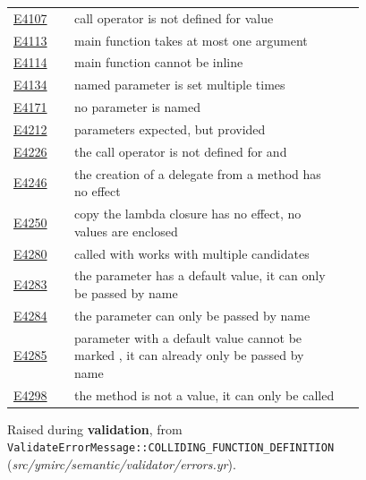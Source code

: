 \begin{longtable}{@{}l p{0.78\linewidth} r@{}}
\hyperref[sec:codes:e4107]{E4107} & call operator is not defined for value \errhole{} & \pageref{sec:codes:e4107}\\
\hyperref[sec:codes:e4113]{E4113} & main function takes at most one argument & \pageref{sec:codes:e4113}\\
\hyperref[sec:codes:e4114]{E4114} & main function cannot be inline & \pageref{sec:codes:e4114}\\
\hyperref[sec:codes:e4134]{E4134} & named parameter \errhole{} is set multiple times & \pageref{sec:codes:e4134}\\
\hyperref[sec:codes:e4171]{E4171} & no parameter is named \errhole{} & \pageref{sec:codes:e4171}\\
\hyperref[sec:codes:e4212]{E4212} & \errhole{} parameters \errhole{} expected, but \errhole{} \errhole{} provided & \pageref{sec:codes:e4212}\\
\hyperref[sec:codes:e4226]{E4226} & the call operator is not defined for \errhole{} and \errhole{} & \pageref{sec:codes:e4226}\\
\hyperref[sec:codes:e4246]{E4246} & the creation of a delegate from a method has no effect & \pageref{sec:codes:e4246}\\
\hyperref[sec:codes:e4250]{E4250} & copy the lambda closure has no effect, no values are enclosed & \pageref{sec:codes:e4250}\\
\hyperref[sec:codes:e4280]{E4280} & \errhole{} called with \errhole{} works with multiple candidates & \pageref{sec:codes:e4280}\\
\hyperref[sec:codes:e4283]{E4283} & the parameter \errhole{} has a default value, it can only be passed by name & \pageref{sec:codes:e4283}\\
\hyperref[sec:codes:e4284]{E4284} & the parameter \errhole{} can only be passed by name & \pageref{sec:codes:e4284}\\
\hyperref[sec:codes:e4285]{E4285} & parameter with a default value cannot be marked \errhole{}, it can already only be passed by name & \pageref{sec:codes:e4285}\\
\hyperref[sec:codes:e4298]{E4298} & the method \errhole{} is not a value, it can only be called & \pageref{sec:codes:e4298}\\
\bottomrule
\end{longtable}

\label{sec:codes:e4023}

Raised during \textbf{validation}, from \texttt{ValidateErrorMessage::\allowbreak{}COLLIDING\_\allowbreak{}FUNCTION\_\allowbreak{}DEFINITION} (\textit{src/\allowbreak{}ymirc/\allowbreak{}semantic/\allowbreak{}validator/\allowbreak{}errors.yr}).

